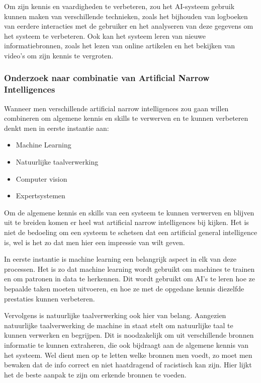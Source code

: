 Om zijn kennis en vaardigheden te verbeteren, zou het AI-systeem gebruik kunnen maken van verschillende technieken, zoals het bijhouden van logboeken van eerdere interacties met de gebruiker en het analyseren van deze gegevens om het systeem te verbeteren. Ook kan het systeem leren van nieuwe informatiebronnen, zoals het lezen van online artikelen en het bekijken van video's om zijn kennis te vergroten.

\subsubsection{Onderzoek naar combinatie van Artificial Narrow Intelligences}

Wanneer men verschillende artificial narrow intelligences zou gaan willen combineren om algemene kennis en skills te verwerven en te kunnen verbeteren denkt men in eerste instantie aan:

\begin{itemize}
    \item Machine Learning
    \item Natuurlijke taalverwerking
    \item Computer vision
    \item Expertsystemen
\end{itemize}

Om de algemene kennis en skills van een systeem te kunnen verwerven en blijven uit te breiden komen er heel wat artificial narrow intelligences bij kijken. Het is niet de bedoeling om een systeem te schetsen dat een artificial general intelligence is, wel is het zo dat men hier een impressie van wilt geven.

In eerste instantie is machine learning een belangrijk aspect in elk van deze processen. Het is zo dat machine learning wordt gebruikt om machines te trainen en om patronen in data te herkennen. Dit wordt gebruikt om AI's te leren hoe ze bepaalde taken moeten uitvoeren, en hoe ze met de opgedane kennis diezelfde prestaties kunnen verbeteren.

Vervolgens is natuurlijke taalverwerking ook hier van belang. Aangezien natuurlijke taalverwerking de machine in staat stelt om natuurlijke taal te kunnen verwerken en begrijpen. Dit is noodzakelijk om uit verschillende bronnen informatie te kunnen extraheren, die ook bijdraagt aan de algemene kennis van het systeem. Wel dient men op te letten welke bronnen men voedt, zo moet men bewaken dat de info correct en niet haatdragend of racistisch kan zijn. Hier lijkt het de beste aanpak te zijn om erkende bronnen te voeden.

